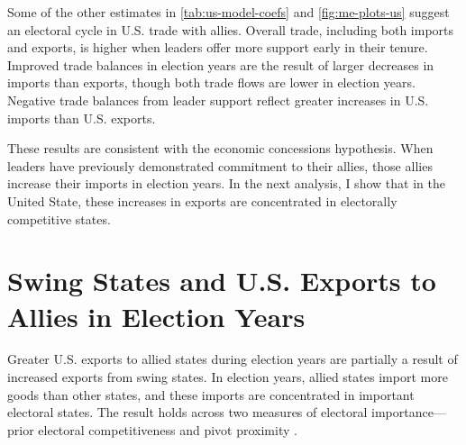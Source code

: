 \documentclass[12pt]{article}
\begin{document}
Some of the other estimates in \autoref{tab:us-model-coefs} and \autoref{fig:me-plots-us} suggest an electoral cycle in U.S. trade with allies.
Overall trade, including both imports and exports, is higher when leaders offer more support early in their tenure.
Improved trade balances in election years are the result of larger decreases in imports than exports, though both trade flows are lower in election years.
Negative trade balances from leader support reflect greater increases in U.S. imports than U.S. exports. 


These results are consistent with the economic concessions hypothesis. 
When leaders have previously demonstrated commitment to their allies, those allies increase their imports in election years.
In the next analysis, I show that in the United State, these increases in exports are concentrated in electorally competitive states.



\section{Swing States and U.S. Exports to Allies in Election Years}


Greater U.S. exports to allied states during election years are partially a result of increased exports from swing states.
In election years, allied states import more goods than other states, and these imports are concentrated in important electoral states.
The result holds across two measures of electoral importance--- prior electoral competitiveness and pivot proximity \citep{Wright2009}.
\end{document}
